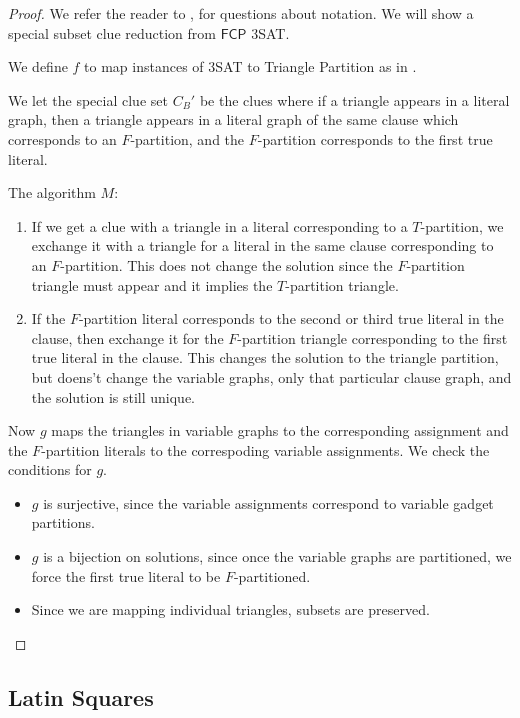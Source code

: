 \documentclass[runningheads,a4paper]{llncs}
\begin{document}
\begin{proof}
We refer the reader to \cite{holyer1981np}, \cite{colbourn1984complexity} for questions about notation. We will show a special subset clue reduction from $\mathsf{FCP}$ 3SAT. 

We define $f$ to map instances of 3SAT to Triangle Partition as in \cite{holyer1981np}.

We let the special clue set $C_B'$ be the clues where if a triangle appears in a literal graph, then a triangle appears in a literal graph of the same clause which corresponds to an $F$-partition, and the $F$-partition corresponds to the first true literal.

The algorithm $M$: 
\begin{enumerate}
\item If we get a clue with a triangle in a literal corresponding to a $T$-partition, we exchange it with a triangle for a literal in the same clause corresponding to an $F$-partition. This does not change the solution since the $F$-partition triangle must appear and it implies the $T$-partition triangle. 
\item If the $F$-partition literal corresponds to the second or third true literal in the clause, then exchange it for the $F$-partition triangle corresponding to the first true literal in the clause. This changes the solution to the triangle partition, but doens't change the variable graphs, only that particular clause graph, and the solution is still unique.
\end{enumerate}

Now $g$ maps the triangles in variable graphs to the corresponding assignment and the $F$-partition literals to the correspoding variable assignments. We check the conditions for $g$.
\begin{itemize}
\item $g$ is surjective, since the variable assignments correspond to variable gadget partitions.
\item $g$ is a bijection on solutions, since once the variable graphs are partitioned, we force the first true literal to be $F$-partitioned. 
\item Since we are mapping individual triangles, subsets are preserved.
\end{itemize}
\end{proof}

\subsection{Latin Squares}
\end{document}
